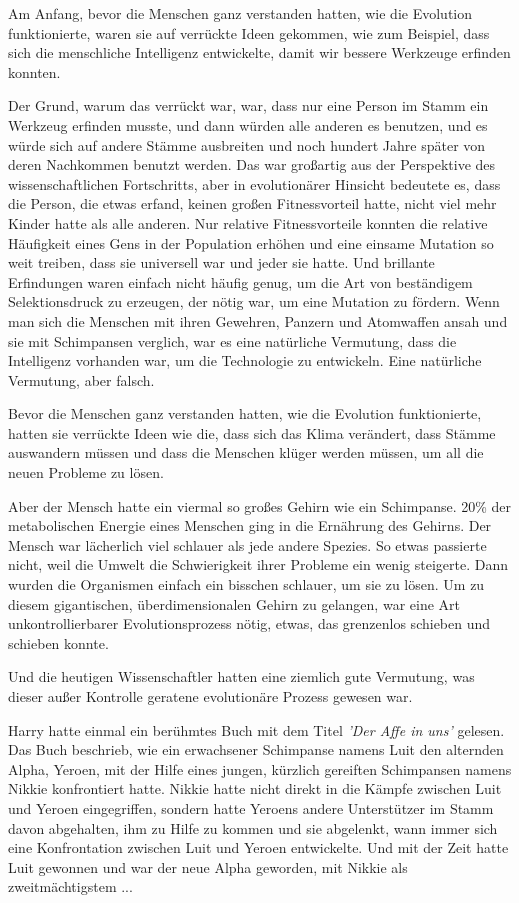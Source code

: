 Am Anfang, bevor die Menschen ganz verstanden hatten, wie die Evolution
funktionierte, waren sie auf verrückte Ideen gekommen, wie zum Beispiel, dass
sich die menschliche Intelligenz entwickelte, damit wir bessere Werkzeuge
erfinden konnten.

Der Grund, warum das verrückt war, war, dass nur eine Person im Stamm ein
Werkzeug erfinden musste, und dann würden alle anderen es benutzen, und es würde
sich auf andere Stämme ausbreiten und noch hundert Jahre später von deren
Nachkommen benutzt werden. Das war großartig aus der Perspektive des
wissenschaftlichen Fortschritts, aber in evolutionärer Hinsicht bedeutete es,
dass die Person, die etwas erfand, keinen großen Fitnessvorteil hatte, nicht
viel mehr Kinder hatte als alle anderen. Nur relative Fitnessvorteile konnten
die relative Häufigkeit eines Gens in der Population erhöhen und eine einsame
Mutation so weit treiben, dass sie universell war und jeder sie hatte. Und
brillante Erfindungen waren einfach nicht häufig genug, um die Art von
beständigem Selektionsdruck zu erzeugen, der nötig war, um eine Mutation zu
fördern. Wenn man sich die Menschen mit ihren Gewehren, Panzern und Atomwaffen
ansah und sie mit Schimpansen verglich, war es eine natürliche Vermutung, dass
die Intelligenz vorhanden war, um die Technologie zu entwickeln. Eine natürliche
Vermutung, aber falsch.

Bevor die Menschen ganz verstanden hatten, wie die Evolution funktionierte,
hatten sie verrückte Ideen wie die, dass sich das Klima verändert, dass Stämme
auswandern müssen und dass die Menschen klüger werden müssen, um all die neuen
Probleme zu lösen.

Aber der Mensch hatte ein viermal so großes Gehirn wie ein Schimpanse. 20\% der
metabolischen Energie eines Menschen ging in die Ernährung des Gehirns. Der
Mensch war lächerlich viel schlauer als jede andere Spezies. So etwas passierte
nicht, weil die Umwelt die Schwierigkeit ihrer Probleme ein wenig steigerte.
Dann wurden die Organismen einfach ein bisschen schlauer, um sie zu lösen. Um zu
diesem gigantischen, überdimensionalen Gehirn zu gelangen, war eine Art
unkontrollierbarer Evolutionsprozess nötig, etwas, das grenzenlos schieben und
schieben konnte.

Und die heutigen Wissenschaftler hatten eine ziemlich gute Vermutung, was dieser
außer Kontrolle geratene evolutionäre Prozess gewesen war.

Harry hatte einmal ein berühmtes Buch mit dem Titel \emph{'Der Affe in uns'}
gelesen. Das Buch beschrieb, wie ein erwachsener Schimpanse namens Luit den
alternden Alpha, Yeroen, mit der Hilfe eines jungen, kürzlich gereiften
Schimpansen namens Nikkie konfrontiert hatte. Nikkie hatte nicht direkt in die
Kämpfe zwischen Luit und Yeroen eingegriffen, sondern hatte Yeroens andere
Unterstützer im Stamm davon abgehalten, ihm zu Hilfe zu kommen und sie
abgelenkt, wann immer sich eine Konfrontation zwischen Luit und Yeroen
entwickelte. Und mit der Zeit hatte Luit gewonnen und war der neue Alpha
geworden, mit Nikkie als zweitmächtigstem ...

